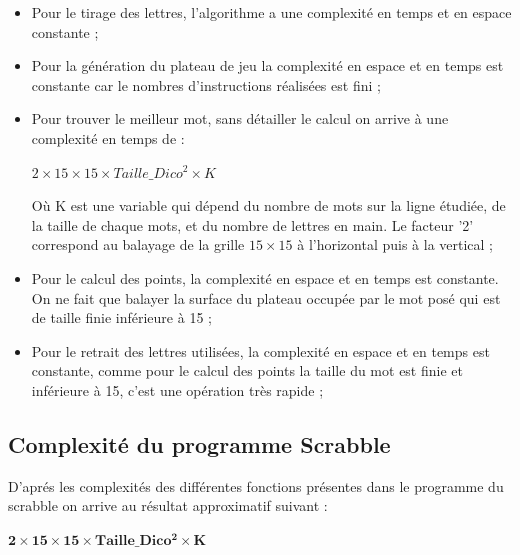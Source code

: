 \documentclass[a4paper,8pt,french,fleqn]{article}
\begin{document}
\begin{itemize}

\item Pour le tirage des lettres, l'algorithme a une complexité en temps et en espace constante ; \\

\item Pour la génération du plateau de jeu la complexité en espace et en temps est constante car le nombres d'instructions réalisées est fini ; \\

\item Pour trouver le meilleur mot, sans détailler le calcul on arrive à une complexité en temps de : \\

  \begin{center}
    $2 \times 15 \times 15 \times Taille\_Dico^{2} \times K$ \vspace{0.5cm}
  \end{center} 

Où K est une variable qui dépend du nombre de mots sur la ligne étudiée, de la taille de chaque mots, et du nombre de lettres en main. Le facteur '2' correspond au balayage de la grille $15 \times 15$ à l'horizontal puis à la vertical ; \\

\item Pour le calcul des points, la complexité en espace et en temps est constante. On ne fait que balayer la surface du plateau occupée par le mot posé qui est de taille finie inférieure à 15 ; \\

\item Pour le retrait des lettres utilisées, la complexité en espace et en temps est constante, comme pour le calcul des points la taille du mot est finie et inférieure à 15, c'est une opération très rapide ; \\

\end{itemize}

\subsection{Complexité du programme Scrabble}

D'aprés les complexités des différentes fonctions présentes dans le programme du scrabble on arrive au résultat approximatif suivant :

\begin{center}
  $\bm{2 \times 15 \times 15 \times Taille\_Dico^{2} \times K}$
\end{center}
\end{document}
